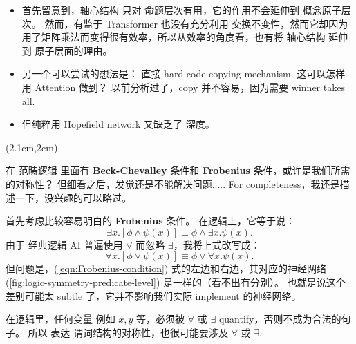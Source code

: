 \begin{preview}
\begin{minipage}{\textwidth}
\begin{itemize}
	\item 首先留意到，轴心结构 只对 命题层次有用，它的作用不会延伸到 概念原子层次。 然而，有监于 Transformer 也没有充分利用 交换不变性，然而它却因为用了矩阵乘法而变得很有效率，所以从效率的角度看，也有将 轴心结构 延伸到 原子层面的理由。

	\item 另一个可以尝试的想法是： 直接 hard-code copying mechanism.  这可以怎样用 Attention 做到？  以前分析过了，copy 并不容易，因为需要 winner takes all.

	\item 但纯粹用 Hopefield network 又缺乏了 深度。
\end{itemize}

\end{minipage}
\end{preview}


\begin{preview}
\begin{minipage}{\textwidth}

\setlength{\parskip}{0.4\baselineskip}
\begin{textblock*}{20cm}(2.1cm,2cm) %
	{}
	\hspace{8cm}
\end{textblock*}
\vspace*{0.3cm} 

在 范畴逻辑 里面有 \textbf{Beck-Chevalley} 条件和 \textbf{Frobenius} 条件，或许是我们所需的对称性？ 但细看之后，发觉还是不能解决问题.....  For completeness，我还是描述一下，没兴趣的可以略过。

首先考虑比较容易明白的 \textbf{Frobenius} 条件。 在逻辑上，它等于说：
\begin{equation}
\exists x. [ \phi \wedge \psi(x) ] \equiv \phi \wedge \exists x. \psi(x).
\end{equation}
由于 经典逻辑 AI 普遍使用 $\forall$ 而忽略 $\exists$，我将上式改写成：
\begin{equation}
\label{eqn:Frobenius-condition}
\forall x. [ \phi \vee \psi(x) ] \equiv \phi \vee \forall x. \psi(x).
\end{equation}
但问题是，(\ref{eqn:Frobenius-condition}) 式的左边和右边，其对应的神经网络 (\ref{fig:logic-symmetry-predicate-level}) 是一样的（看不出有分别）。 也就是说这个差别可能太 subtle 了，它并不影响我们实际 implement 的神经网络。

在逻辑里，任何变量 例如 $x,y$ 等，必须被 $\forall$ 或 $\exists$ quantify，否则不成为合法的句子。 所以 表达 谓词结构的对称性，也很可能要涉及 $\forall$ 或 $\exists$.

\end{minipage}
\end{preview}

